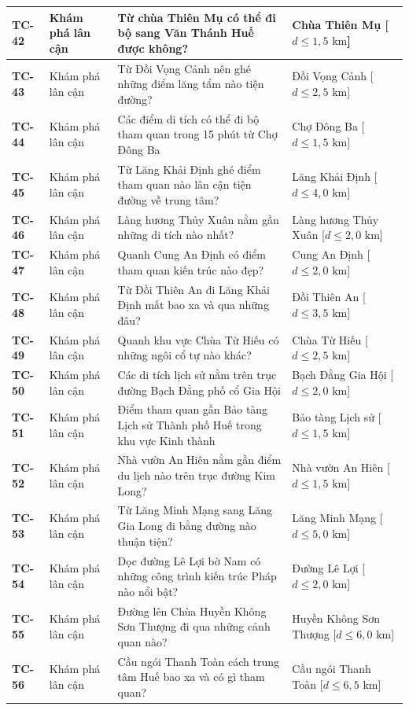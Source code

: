 \begin{longtable}{|>{\centering\arraybackslash\bfseries}p{1.35cm}|>{\raggedright\arraybackslash}p{2.6cm}|>{\raggedright\arraybackslash}p{6.35cm}|>{\raggedright\arraybackslash}p{4.3cm}|}
TC-42 & Khám phá lân cận & Từ chùa Thiên Mụ có thể đi bộ sang Văn Thánh Huế được không? & Chùa Thiên Mụ [$d \le 1{,}5\text{ km}$] \\ \hline
TC-43 & Khám phá lân cận & Từ Đồi Vọng Cảnh nên ghé những điểm lăng tẩm nào tiện đường? & Đồi Vọng Cảnh [$d \le 2{,}5\text{ km}$] \\ \hline
TC-44 & Khám phá lân cận & Các điểm di tích có thể đi bộ tham quan trong 15 phút từ Chợ Đông Ba & Chợ Đông Ba [$d \le 1{,}5\text{ km}$] \\ \hline
TC-45 & Khám phá lân cận & Từ Lăng Khải Định ghé điểm tham quan nào lân cận tiện đường về trung tâm? & Lăng Khải Định [$d \le 4{,}0\text{ km}$] \\ \hline
TC-46 & Khám phá lân cận & Làng hương Thủy Xuân nằm gần những di tích nào nhất? & Làng hương Thủy Xuân [$d \le 2{,}0\text{ km}$] \\ \hline
TC-47 & Khám phá lân cận & Quanh Cung An Định có điểm tham quan kiến trúc nào đẹp? & Cung An Định [$d \le 2{,}0\text{ km}$] \\ \hline
TC-48 & Khám phá lân cận & Từ Đồi Thiên An đi Lăng Khải Định mất bao xa và qua những đâu? & Đồi Thiên An [$d \le 3{,}5\text{ km}$] \\ \hline
TC-49 & Khám phá lân cận & Quanh khu vực Chùa Từ Hiếu có những ngôi cổ tự nào khác? & Chùa Từ Hiếu [$d \le 2{,}5\text{ km}$] \\ \hline
TC-50 & Khám phá lân cận & Các di tích lịch sử nằm trên trục đường Bạch Đằng phố cổ Gia Hội & Bạch Đằng Gia Hội [$d \le 2{,}0\text{ km}$] \\ \hline
TC-51 & Khám phá lân cận & Điểm tham quan gần Bảo tàng Lịch sử Thành phố Huế trong khu vực Kinh thành & Bảo tàng Lịch sử [$d \le 1{,}5\text{ km}$] \\ \hline
TC-52 & Khám phá lân cận & Nhà vườn An Hiên nằm gần điểm du lịch nào trên trục đường Kim Long? & Nhà vườn An Hiên [$d \le 1{,}5\text{ km}$] \\ \hline
TC-53 & Khám phá lân cận & Từ Lăng Minh Mạng sang Lăng Gia Long đi bằng đường nào thuận tiện? & Lăng Minh Mạng [$d \le 5{,}0\text{ km}$] \\ \hline
TC-54 & Khám phá lân cận & Dọc đường Lê Lợi bờ Nam có những công trình kiến trúc Pháp nào nổi bật? & Đường Lê Lợi [$d \le 2{,}0\text{ km}$] \\ \hline
TC-55 & Khám phá lân cận & Đường lên Chùa Huyền Không Sơn Thượng đi qua những cảnh quan nào? & Huyền Không Sơn Thượng [$d \le 6{,}0\text{ km}$] \\ \hline
TC-56 & Khám phá lân cận & Cầu ngói Thanh Toàn cách trung tâm Huế bao xa và có gì tham quan? & Cầu ngói Thanh Toàn [$d \le 6{,}5\text{ km}$] \\ \hline

\end{longtable}
